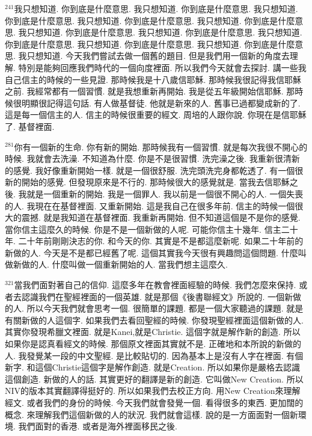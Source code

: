 \documentclass{book}
\begin{document}
$^{241}$我只想知道.
你到底是什麼意思.
我只想知道.
你到底是什麼意思.
我只想知道.
你到底是什麼意思.
我只想知道.
你到底是什麼意思.
我只想知道.
你到底是什麼意思.
我只想知道.
你到底是什麼意思.
我只想知道.
你到底是什麼意思.
我只想知道.
你到底是什麼意思.
我只想知道.
你到底是什麼意思.
我只想知道.
你到底是什麼意思.
我只想知道.
今天我們嘗試去做一個舊的題目.
但是我們用一個新的角度去理解.
特別是能夠回應我們時代的一個向度裡面.
所以我們今天就會去探討.
講一些我自己信主的時候的一些見證.
那時候我是十八歲信耶穌.
那時候我很記得我信耶穌之前.
我經常都有一個習慣.
就是我想重新再開始.
我是從五年級開始信耶穌.
那時候很明顯很記得這句話.
有人做基督徒.
他就是新來的人.
舊事已過都變成新的了.
這是每一個信主的人.
信主的時候很重要的經文.
周培的人跟你說.
你現在是信耶穌了.
基督裡面.

$^{281}$你有一個新的生命.
你有新的開始.
那時候我有一個習慣.
就是每次我很不開心的時候.
我就會去洗澡.
不知道為什麼.
你是不是很習慣.
洗完澡之後.
我重新很清新的感覺.
我好像重新開始一樣.
就是一個很舒服.
洗完頭洗完身都乾透了.
有一個很新的開始的感覺.
但發現原來是不行的.
那時候很大的感覺就是.
當我去信耶穌之後.
我就是一個重新的開始.
我是一個罪人.
我以前是一個很不開心的人.
一個失喪的人.
我現在在基督裡面.
又重新開始.
這是我自己在很多年前.
信主的時候一個很大的震撼.
就是我知道在基督裡面.
我重新再開始.
但不知道這個是不是你的感覺.
當你信主這麼久的時候.
你是不是一個新做的人呢.
可能你信主十幾年.
信主二十年.
二十年前剛剛決志的你.
和今天的你.
其實是不是都這麼新呢.
如果二十年前的新做的人.
今天是不是都已經舊了呢.
這個其實我今天很有興趣問這個問題.
什麼叫做新做的人.
什麼叫做一個重新開始的人.
當我們想主這麼久.

$^{321}$當我們面對著自己的信仰.
這麼多年在教會裡面經驗的時候.
我們怎麼來保持.
或者去認識我們在聖經裡面的一個英雄.
就是那個《後書聯經文》所說的.
一個新做的人.
所以今天我們就會思考一個.
很簡單的課題.
都是一個大家聽過的課題.
就是有關新做的人這個字.
如果我們去看回聖經的時候.
你發現聖經裡面這個新做的人.
其實你發現希臘文裡面.
就是Kanei,就是Christie.
這個字就是解作新的創造.
所以如果你是認真看經文的時候.
那個原文裡面其實就不是.
正確地和本所說的新做的人.
我發覺某一段的中文聖經.
是比較貼切的.
因為基本上是沒有人字在裡面.
有個新字.
和這個Christie這個字是解作創造.
就是Creation.
所以如果你是嚴格去認識這個創造.
新做的人的話.
其實更好的翻譯是新的創造.
它叫做New Creation.
所以NIV的版本其實翻譯得挺好的.
所以如果我們去校正方向.
用New Creation來理解經文.
或者我們的身份的時候.
今天我們就會發覺一個.
看得很多的東西.
更加闊的概念.
來理解我們這個新做的人的狀況.
我們就會這樣.
說的是一方面面對一個新環境.
我們面對的香港.
或者是海外裡面移民之後.
\end{document}

